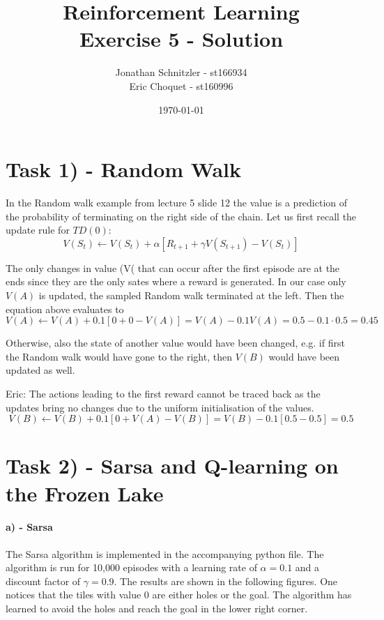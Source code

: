 \documentclass{article}
\title{Reinforcement Learning \\ Exercise 5 - Solution}
\author{Jonathan Schnitzler - st166934 \\
Eric Choquet - st160996}
\date{\today}
\begin{document}
\maketitle
\section*{Task 1) - Random Walk}
In the Random walk example from lecture 5 slide 12 the value is a prediction of the probability of terminating on the right side of the chain. Let us first recall the update rule for $TD(0)$:
\begin{equation}
    V(S_t) \leftarrow V(S_t) + \alpha \left[ R_{t+1} + \gamma V(S_{t+1}) - V(S_t) \right]
\end{equation}

The only changes in value (V( that can occur after the first episode are at the ends since they are the only sates where a reward is generated. In our case only $V(A)$ is updated, the sampled Random walk terminated at the left. Then the equation above evaluates to
\begin{equation}
    V(A) \leftarrow V(A) + 0.1 \left[ 0 + 0 - V(A) \right] = V(A) - 0.1 V(A) = 0.5 - 0.1 \cdot 0.5 = 0.45
\end{equation}

Otherwise, also the state of another value would have been changed, e.g. if first the Random walk would have gone to the right, then $V(B)$ would have been updated as well.

Eric: 
The actions leading to the first reward cannot be traced back as the updates bring no changes due to the uniform initialisation of the values.
\begin{equation}
    V(B) \leftarrow V(B) + 0.1 \left[ 0 + V(A) - V(B) \right] = V(B) - 0.1 [0.5 -0.5] = 0.5
\end{equation}

\section*{Task 2) - Sarsa and Q-learning on the Frozen Lake}

\paragraph*{a) - Sarsa}

The Sarsa algorithm is implemented in the accompanying python file. The algorithm is run for 10,000 episodes with a learning rate of $\alpha = 0.1$ and a discount factor of $\gamma = 0.9$. The results are shown in the following figures. One notices that the tiles with value 0 are either holes or the goal. The algorithm has learned to avoid the holes and reach the goal in the lower right corner.
\end{document}
